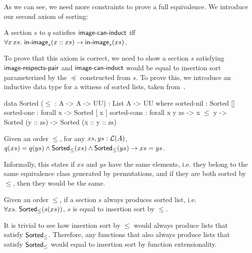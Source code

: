 As we can see, we need more constraints to prove a full equivalence.
We introduce our second axiom of sorting:
\begin{definition}
    A section $s$ to $q$ satisfies $\operatorname{\mathsf{image-can-induct}}$ iff
    $\forall x\,xs.\,\operatorname{\mathsf{in-image}}_s(x :: xs) \to \operatorname{\mathsf{in-image}}_s(xs)$.
\end{definition}

To prove that this axiom is correct, we need to show a section $s$ satisfying
$\operatorname{\mathsf{image-respects-pair}}$ and $\operatorname{\mathsf{image-can-induct}}$ would be equal to insertion sort parameterized by
the $\preccurlyeq$ constructed from $s$. To prove this, we introduce an inductive data type
for a witness of sorted lists, taken from~\cite{appelVerifiedFunctionalAlgorithms2023}.

\begin{code}
data Sorted ($\leq$ : A -> A -> UU) : List A -> UU where
  sorted-nil : Sorted []
  sorted-one : forall x -> Sorted [ x ]
  sorted-cons : forall x y zs -> x $\leq$ y -> Sorted (y :: zs) -> Sorted (x :: y :: zs)
\end{code}

\begin{proposition}
    Given an order $\leq$, for any $xs, ys : \mathcal{L}(A)$,
    $q(xs) = q(ys) \land \operatorname{\mathsf{Sorted}}_{\leq}(xs) \land \operatorname{\mathsf{Sorted}}_{\leq}(ys) \to xs = ys$.
\end{proposition}

Informally, this states if $xs$ and $ys$ have the same elements, i.e. they belong to the same
equivalence class generated by permutations, and if they are both sorted by $\leq$, then they would be the same.

\begin{corollary}\label{sort:sort-uniq}
    Given an order $\leq$,
    if a section $s$ always produces sorted list, i.e. $\forall xs.\,\operatorname{\mathsf{Sorted}}_{\leq}(s(xs))$,
    $s$ is equal to insertion sort by $\leq$.
\end{corollary}
It is trivial to see how insertion sort by $\leq$ would always produce lists that satisfy
$\operatorname{\mathsf{Sorted}}_{\leq}$. Therefore, any functions that also always produce lists that satisfy
$\operatorname{\mathsf{Sorted}}_{\leq}$ would equal to insertion sort by function extensionality.

